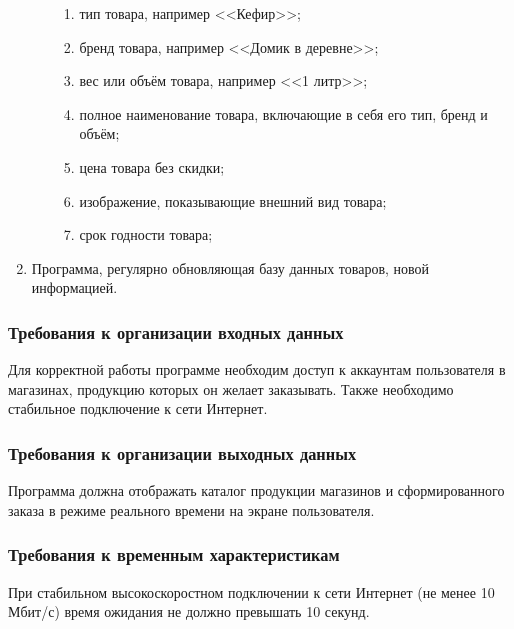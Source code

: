 \documentclass[a4paper,12pt,reqno]{article}
\begin{document}
\begin{enumerate}
\begin{enumerate}
\begin{enumerate}
        \item тип товара, например <<Кефир>>;
        \item бренд товара, например <<Домик в деревне>>;
        \item вес или объём товара, например <<1 литр>>;
        \item полное наименование товара, включающие в себя его тип, бренд и объём;
        \item цена товара без скидки;
        \item изображение, показывающие внешний вид товара;
        \item срок годности товара;
      \end{enumerate}
    \end{enumerate}
    \item Программа, регулярно обновляющая базу данных товаров, новой информацией.
  \end{enumerate}

  \subsubsection{Требования к организации входных данных}
  Для корректной работы программе необходим доступ к аккаунтам пользователя в магазинах, продукцию которых он желает заказывать.
  Также необходимо стабильное подключение к сети Интернет.
  \subsubsection{Требования к организации выходных данных}
  Программа должна отображать каталог продукции магазинов и сформированного заказа в режиме реального времени на экране пользователя.
  \subsubsection{Требования к временным характеристикам}
  При стабильном высокоскоростном подключении к сети Интернет (не менее 10 Мбит/с) время ожидания не должно превышать 10 секунд.
\end{document}
